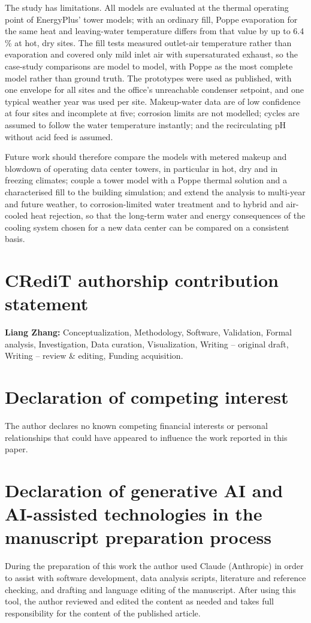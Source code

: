 \documentclass[preprint,12pt]{elsarticle}
\begin{document}
The study has limitations. All models are evaluated at the thermal operating point of EnergyPlus' tower models; with an
ordinary fill, Poppe evaporation for the same heat and leaving-water temperature differs from that value by up to
6.4\,\% at hot, dry sites. The fill tests measured outlet-air temperature rather than evaporation and covered only mild
inlet air with supersaturated exhaust, so the case-study comparisons are model to model, with Poppe as the most complete
model rather than ground truth. The prototypes were used as published, with one envelope for all sites and the office's
unreachable condenser setpoint, and one typical weather year was used per site. Makeup-water data are of low confidence
at four sites and incomplete at five; corrosion limits are not modelled; cycles are assumed to follow the water
temperature instantly; and the recirculating pH without acid feed is assumed.

Future work should therefore compare the models with metered makeup and blowdown of operating data center towers, in
particular in hot, dry and in freezing climates; couple a tower model with a Poppe thermal solution and a characterised
fill to the building simulation; and extend the analysis to multi-year and future weather, to corrosion-limited water
treatment and to hybrid and air-cooled heat rejection, so that the long-term water and energy consequences of the cooling
system chosen for a new data center can be compared on a consistent basis.

\section*{CRediT authorship contribution statement}
\textbf{Liang Zhang:} Conceptualization, Methodology, Software, Validation, Formal analysis, Investigation, Data
curation, Visualization, Writing -- original draft, Writing -- review \& editing, Funding acquisition.

\section*{Declaration of competing interest}
The author declares no known competing financial interests or personal relationships that could have
appeared to influence the work reported in this paper.

\section*{Declaration of generative AI and AI-assisted technologies in the manuscript preparation process}
During the preparation of this work the author used Claude (Anthropic) in order to assist with software development,
data analysis scripts, literature and reference checking, and drafting and language editing of the manuscript. After
using this tool, the author reviewed and edited the content as needed and takes full responsibility for the content of
the published article.
\end{document}
